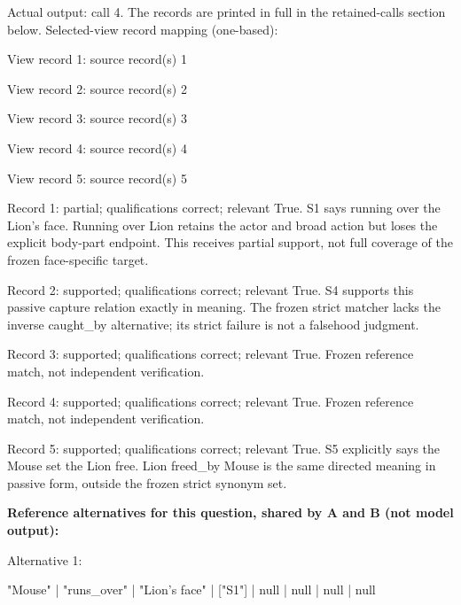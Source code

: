 Actual output: call 4. The records are printed in full in the retained-calls section below. Selected-view record mapping (one-based):

View record 1: source record(s) 1\par

View record 2: source record(s) 2\par

View record 3: source record(s) 3\par

View record 4: source record(s) 4\par

View record 5: source record(s) 5\par

\noindent Record 1: partial; qualifications correct; relevant True. S1 says running over the Lion's face. Running over Lion retains the actor and broad action but loses the explicit body-part endpoint. This receives partial support, not full coverage of the frozen face-specific target.\par\smallskip

\noindent Record 2: supported; qualifications correct; relevant True. S4 supports this passive capture relation exactly in meaning. The frozen strict matcher lacks the inverse caught\_by alternative; its strict failure is not a falsehood judgment.\par\smallskip

\noindent Record 3: supported; qualifications correct; relevant True. Frozen reference match, not independent verification.\par\smallskip

\noindent Record 4: supported; qualifications correct; relevant True. Frozen reference match, not independent verification.\par\smallskip

\noindent Record 5: supported; qualifications correct; relevant True. S5 explicitly says the Mouse set the Lion free. Lion freed\_by Mouse is the same directed meaning in passive form, outside the frozen strict synonym set.\par\smallskip

\noindent\textbf{Reference alternatives for this question, shared by A and B (not model output):}

\noindent Alternative 1:

"Mouse" | "runs\_over" | "Lion's face" | ["S1"] | null | null | null | null\par\smallskip

